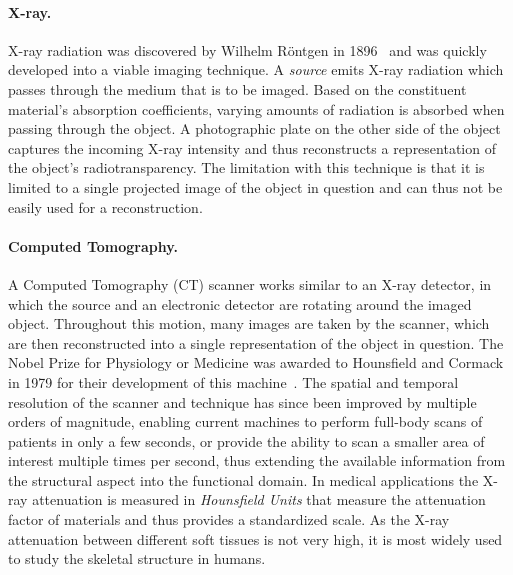\paragraph{X-ray. } X-ray radiation was discovered by Wilhelm R\"ontgen in 1896~\cite{rontgen1896xray} and was quickly developed into a viable imaging technique.  A \emph{source} emits X-ray radiation which passes through the medium that is to be imaged.  Based on the constituent material's absorption coefficients, varying amounts of radiation is absorbed when passing through the object.  A photographic plate on the other side of the object captures the incoming X-ray intensity and thus reconstructs a representation of the object's radiotransparency.  The limitation with this technique is that it is limited to a single  projected image of the object in question and can thus not be easily used for a  reconstruction.

\paragraph{Computed Tomography. }  A Computed Tomography (CT) scanner works similar to an X-ray detector, in which the source and an electronic detector are rotating around the imaged object.  Throughout this motion, many images are taken by the scanner, which are then reconstructed into a single  representation of the object in question.  The Nobel Prize for Physiology or Medicine was awarded to Hounsfield and Cormack in 1979 for their development of this machine~\cite{hounsfield1980computed}.  The spatial and temporal resolution of the scanner and technique has since been improved by multiple orders of magnitude, enabling current machines to perform full-body scans of patients in only a few seconds, or provide the ability to scan a smaller area of interest multiple times per second, thus extending the available information from the structural aspect into the functional domain.  In medical applications the X-ray attenuation is measured in \emph{Hounsfield Units} that measure the attenuation factor of materials and thus provides a standardized scale.  As the X-ray attenuation between different soft tissues is not very high, it is most widely used to study the skeletal structure in humans.

